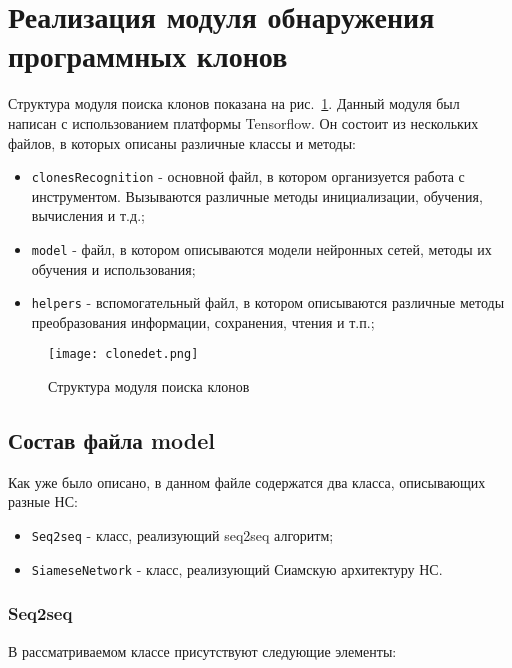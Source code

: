 \section{Реализация модуля обнаружения программных клонов}

Структура модуля поиска клонов показана на рис.~\ref{fig:clonedet}. Данный модуля был написан с использованием платформы Tensorflow. Он состоит из нескольких файлов, в которых описаны различные классы и методы:

\begin{itemize}
\setlength\itemsep{0mm}
\item \texttt{clonesRecognition} - основной файл, в котором организуется работа с инструментом. Вызываются различные методы инициализации, обучения, вычисления и т.д.;
\item \texttt{model} - файл, в котором описываются модели нейронных сетей, методы их обучения и использования;
\item \texttt{helpers} - вспомогательный файл, в котором описываются различные методы преобразования информации, сохранения, чтения и т.п.;
\end{itemize}

\begin{figure}[htbp]
\centering
\texttt{[image: clonedet.png]}
\caption{Структура модуля поиска клонов}
\label{fig:clonedet}
\end{figure}

\subsection{Состав файла model}

Как уже было описано, в данном файле содержатся два класса, описывающих разные НС:

\begin{itemize}
\setlength\itemsep{0mm}
\item \texttt{Seq2seq} - класс, реализующий seq2seq алгоритм;
\item \texttt{SiameseNetwork} - класс, реализующий Сиамскую архитектуру НС.
\end{itemize}

\subsubsection{Seq2seq}

В рассматриваемом классе присутствуют следующие элементы:

